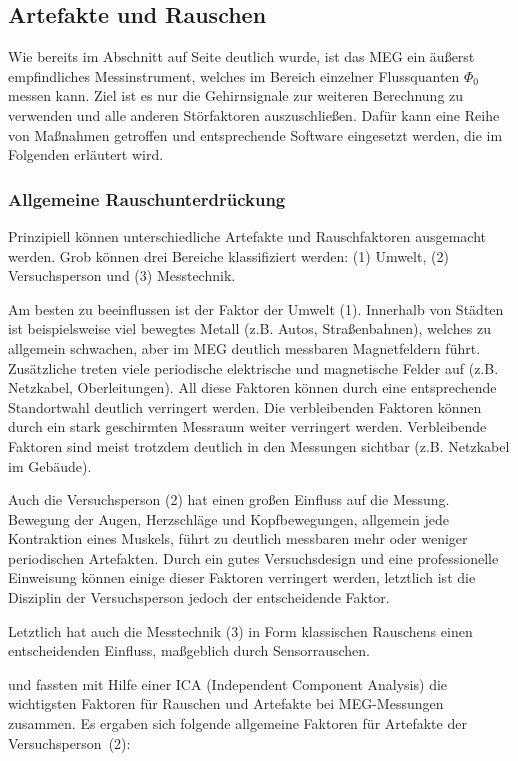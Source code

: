 \documentclass[doc,a4paper,12pt]{apa6}
\makeatletter
\DeclareRobustCommand*{\nameref}[1]{%
      \glqq{\myorg@nameref{#1}}\grqq%
    }%
\makeatother
\begin{document}
\subsection{Artefakte und Rauschen}

Wie bereits im Abschnitt \nameref{sec:squids} auf Seite \pageref{sec:squids} deutlich wurde, ist das MEG ein äußerst empfindliches Messinstrument, welches im Bereich einzelner Flussquanten $\Phi_0$ messen kann. Ziel ist es nur die Gehirnsignale zur weiteren Berechnung zu verwenden und alle anderen Störfaktoren auszuschließen. Dafür kann eine Reihe von Maßnahmen getroffen und entsprechende Software eingesetzt werden, die im Folgenden erläutert wird.

\subsubsection{Allgemeine Rauschunterdrückung}
\label{sec:rauschen}

Prinzipiell können unterschiedliche Artefakte und Rauschfaktoren ausgemacht werden. Grob können drei Bereiche klassifiziert werden: (1) Umwelt, (2) Versuchsperson und (3) Messtechnik.

Am besten zu beeinflussen ist der Faktor der Umwelt (1). Innerhalb von Städten ist beispielsweise viel bewegtes Metall (z.B. Autos, Straßenbahnen), welches zu allgemein schwachen, aber im MEG deutlich messbaren Magnetfeldern führt. Zusätzliche treten viele periodische elektrische und magnetische Felder auf (z.B. Netzkabel, Oberleitungen). All diese Faktoren können durch eine entsprechende Standortwahl deutlich verringert werden. Die verbleibenden Faktoren können durch ein stark geschirmten Messraum weiter verringert werden. Verbleibende Faktoren sind meist trotzdem deutlich in den Messungen sichtbar (z.B. Netzkabel im Gebäude).

Auch die Versuchsperson (2) hat einen großen Einfluss auf die Messung. Bewegung der Augen, Herzschläge und Kopfbewegungen, allgemein jede Kontraktion eines Muskels, führt zu deutlich messbaren mehr oder weniger periodischen Artefakten. Durch ein gutes Versuchsdesign und eine professionelle Einweisung können einige dieser Faktoren verringert werden, letztlich ist die Disziplin der Versuchsperson jedoch der entscheidende Faktor.

Letztlich hat auch die Messtechnik (3) in Form klassischen Rauschens einen entscheidenden Einfluss, maßgeblich durch Sensorrauschen.

\textcite{vigario1998independent} und \textcite{vigario2000independent} fassten mit Hilfe einer ICA (Independent Component Analysis) die wichtigsten Faktoren für Rauschen und Artefakte bei MEG-Messungen zusammen. Es ergaben sich folgende allgemeine Faktoren für Artefakte der Versuchsperson~(2):
\end{document}
